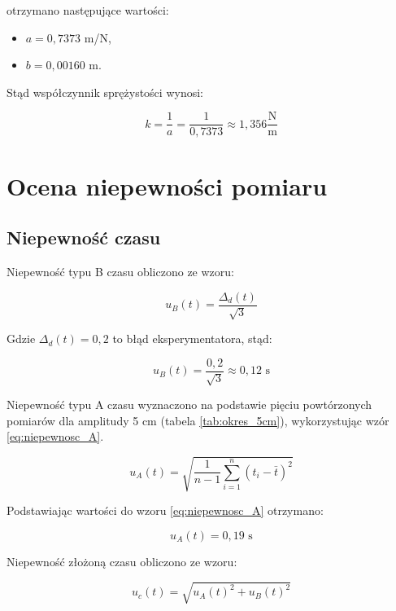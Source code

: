 \documentclass[a4paper,12pt]{article}
\begin{document}
otrzymano następujące wartości:
\begin{itemize}
    \setlength{\itemsep}{0em}
    \item $a = 0,7373$ m/N,
    \item $b = 0,00160$ m.
\end{itemize}

Stąd współczynnik sprężystości wynosi:

\begin{equation*}
    k = \frac{1}{a} = \frac{1}{0{,}7373} \approx 1{,}356 \frac{\text{N}}{\text{m}}
\end{equation*}


\section{Ocena niepewności pomiaru}

\subsection{Niepewność czasu}

Niepewność typu B czasu obliczono ze wzoru:

\begin{equation*}
    u_B(t) = \frac{\Delta_d(t)}{\sqrt{3}}
\end{equation*}

Gdzie $\Delta_d(t) = 0,2$ to błąd eksperymentatora, stąd:

\begin{equation*}
    u_B(t) = \frac{0,2}{\sqrt{3}} \approx 0,12 \text{ s}
\end{equation*}

Niepewność typu A czasu wyznaczono na podstawie pięciu powtórzonych pomiarów dla amplitudy 5 cm (tabela \ref{tab:okres_5cm}), wykorzystując wzór \ref{eq:niepewnosc_A}.

\begin{equation} \label{eq:niepewnosc_A}
    u_A(t) = \sqrt{\frac{1}{n-1} \sum_{i=1}^{n} (t_i - \bar{t})^2}
\end{equation}

Podstawiając wartości do wzoru \ref{eq:niepewnosc_A} otrzymano:

\begin{equation*}
    u_A(t) = 0{,}19 \text{ s}
\end{equation*}

Niepewność złożoną czasu obliczono ze wzoru:

\begin{equation*}
    u_c(t) = \sqrt{u_A(t)^2 + u_B(t)^2}
\end{equation*}
\end{document}
